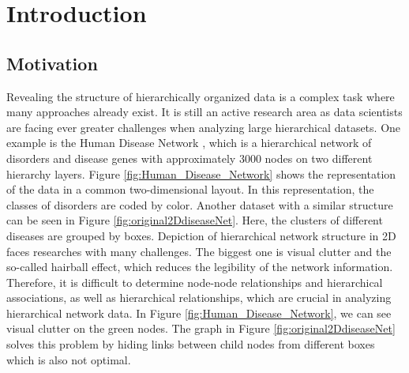 \chapter{Introduction}

\section{Motivation}
Revealing the structure of hierarchically organized data is a complex task where many approaches already exist. It is still an active research area as data scientists are facing ever greater challenges when analyzing large hierarchical datasets. One example is the Human Disease Network \cite{zhou_human_2014}, which is a hierarchical network of disorders and disease genes with approximately 3000 nodes on two different hierarchy layers. Figure \ref{fig:Human_Disease_Network} shows the representation of the data in a common two-dimensional layout. In this representation, the classes of disorders are coded by color. 
Another dataset with a similar structure can be seen in Figure \ref{fig:original2DdiseaseNet}. Here, the clusters of different diseases are grouped by boxes. 
Depiction of hierarchical network structure in 2D faces researches with many challenges. The biggest one is visual clutter and the so-called hairball effect, which reduces the legibility of the network information. Therefore, it is difficult to determine node-node relationships and hierarchical associations, as well as hierarchical relationships, which are crucial in analyzing hierarchical network data. In Figure \ref{fig:Human_Disease_Network}, we can see visual clutter on the green nodes. The graph in Figure \ref{fig:original2DdiseaseNet} solves this problem by hiding links between child nodes from different boxes which is also not optimal.

